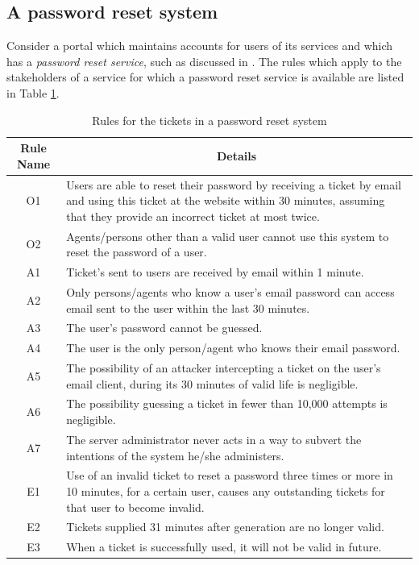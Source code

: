 \subsection{A password reset system}
Consider a portal which maintains accounts for users of its services and which has a {\em password reset service}, such as discussed in \cite{exptsandproofs}. The rules which apply to the stakeholders of a service for which a password reset service is available are listed in Table \ref{pwresetrules}.
\begin{table}[tb]
\caption{Rules for the tickets in a password reset system}\label{pwresetrules}
\begin{center}
\begin{tabular}{|c|p{6cm}|}
\hline
		\bf Rule Name&\multicolumn{1}{|c|}{\bf Details}\\
\hline
O1 & Users are able to reset their password by receiving a ticket by email and using this ticket 
at the website within 30 minutes, assuming that they provide an incorrect ticket at most twice.\\
O2 & Agents/persons other than a valid user cannot use this system to reset the password of a user.\\
A1 & Ticket's sent to users are received by email within 1 minute.\\
A2 & Only persons/agents who know a user's email password can access email sent to the user within
the last 30 minutes.\\
A3 & The user's password cannot be guessed.\\
A4 & The user is the only person/agent who knows their email password.\\
A5 & The possibility of an attacker intercepting a ticket on
the user's email client, during its 30 minutes of valid life is negligible.\\
A6 & The possibility guessing a ticket in fewer than 10,000 attempts is negligible.\\
A7 & The server administrator never acts in a way to subvert the intentions of the system he/she administers.\\
E1 & Use of an invalid ticket to reset a password three times or more in 10 minutes, for
a certain user, causes any outstanding tickets for that user to become invalid.\\
E2 & Tickets supplied 31 minutes after generation are no longer valid.\\
E3 & When a ticket is successfully used, it will not be valid in future.\\

\end{tabular}
\end{center}
\end{table}
